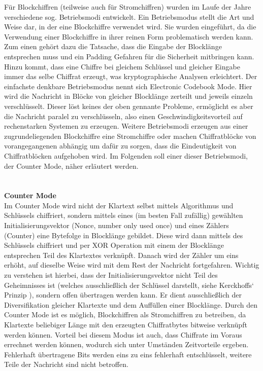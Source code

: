 \documentclass[13pt,a4paper,bibliography=totocnumbered,listof=totocnumbered]{scrartcl}
\begin{document}
Für Blockchiffren (teilweise auch für Stromchiffren) wurden im Laufe der Jahre verschiedene sog. Betriebsmodi entwickelt. Ein Betriebsmodus stellt die Art und Weise dar, in der eine Blockchiffre verwendet wird. Sie wurden eingeführt, da die Verwendung einer Blockchiffre in ihrer reinen Form problematisch werden kann. Zum einen gehört dazu die Tatsache, dass die Eingabe der Blocklänge entsprechen muss und ein Padding Gefahren für die Sicherheit mitbringen kann. Hinzu kommt, dass eine Chiffre bei gleichem Schlüssel und gleicher Eingabe immer das selbe Chiffrat erzeugt, was kryptographische Analysen erleichtert. Der einfachste denkbare Betriebsmodus nennt sich Electronic Codebook Mode. Hier wird die Nachricht in Blöcke von gleicher Blocklänge zerteilt und jeweils einzeln verschlüsselt. Dieser löst keines der oben gennante Probleme, ermöglicht es aber die Nachricht paralel zu verschlüsseln, also einen Geschwindigkeitsvorteil auf rechenstarken Systemen zu erzeugen. Weitere Betriebsmodi erzeugen aus einer zugrundeliegenden Blockchiffre eine Stromchiffre oder machen Chiffratblöcke von vorangegangenen abhängig um dafür zu sorgen, dass die Eindeutigkeit von Chiffratblöcken aufgehoben wird. Im Folgenden soll einer dieser Betriebsmodi, der Counter Mode, näher erläutert werden.\\
\cite[S. 223ff.]{42} \cite[S. 23f]{13} \cite[S. 88-94]{48}\\
\\\textbf{Counter Mode}\\
Im Counter Mode wird nicht der Klartext selbst mittels Algorithmus und Schlüssels chiffriert, sondern mittels eines (im besten Fall zufällig) gewählten Initialisierungsvektor (Nonce, number only used once) und eines Zählers (Counter) eine Bytefolge in Blocklänge gebildet. Diese wird dann mittels des Schlüssels chiffriert und per XOR Operation mit einem der Blocklänge entsprechen Teil des Klartextes verknüpft. Danach wird der Zähler um eins erhöht, auf dieselbe Weise wird mit dem Rest der Nachricht fortgefahren. Wichtig zu verstehen ist hierbei, dass der Initialisierungsvektor nicht Teil des Geheimnisses ist (welches ausschließlich der Schlüssel darstellt, siehe Kerckhoffs‘ Prinzip \cite[S. 38]{48}), sondern offen übertragen werden kann. Er dient ausschließlich der Diversifikation gleicher Klartexte und dem Auffüllen einer Blocklänge. Durch den Counter Mode ist es möglich, Blockchiffren als Stromchiffren zu betreiben, da Klartexte beliebiger Länge mit den erzeugten Chiffratbytes bitweise verknüpft werden können. Vorteil bei diesem Modus ist auch, dass Chiffrate im Voraus errechnet werden können, wodurch sich unter Umständen Zeitvorteile ergeben. Fehlerhaft übertragene Bits werden eins zu eins fehlerhaft entschlüsselt, weitere Teile der Nachricht sind nicht betroffen.\\
\end{document}
